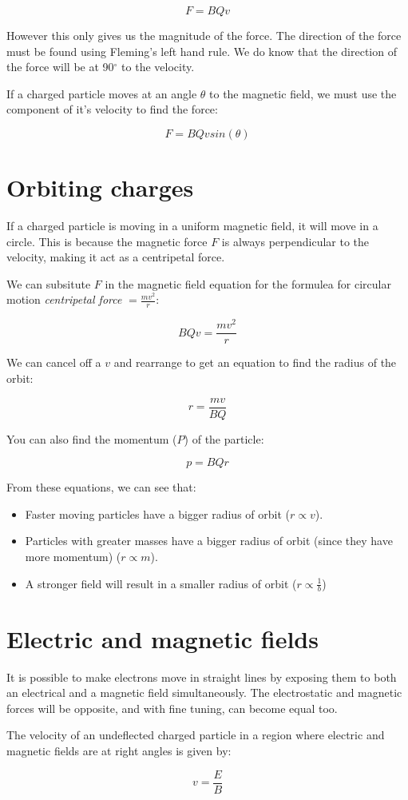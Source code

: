 \documentclass{article}
\begin{document}
\[
	F = BQv
\]

However this only gives us the magnitude of the force. The direction of the
force must be found using Fleming's left hand rule. We do know that the
direction of the force will be at 90$^\circ$ to the velocity.

If a charged particle moves at an angle $\theta$ to the magnetic field, we must
use the component of it's velocity to find the force:

\[
	F = BQvsin(\theta)
\]

\section*{Orbiting charges}

If a charged particle is moving in a uniform magnetic field, it will move in a
circle. This is because the magnetic force $F$ is always perpendicular to the
velocity, making it act as a centripetal force.

We can subsitute $F$ in the magnetic field equation for the formulea for
circular motion {\it centripetal force} $= \frac{mv^2}{r}$:

\[
	BQv = \frac{mv^2}{r}
\]

We can cancel off a $v$ and rearrange to get an equation to find the radius of
the orbit:

\[
	r = \frac{mv}{BQ}
\]

You can also find the momentum ($P$) of the particle: 

\[
	p = BQr
\]

From these equations, we can see that:

\begin{itemize}

	\item Faster moving particles have a bigger radius of orbit ($r \propto v$).

	\item Particles with greater masses have a bigger radius of orbit (since
	they have more momentum) ($r \propto m$).

	\item A stronger field will result in a smaller radius of orbit ($r \propto
	\frac{1}{b}$)

\end{itemize}

\section*{Electric and magnetic fields}

It is possible to make electrons move in straight lines by exposing them to both
an electrical and a magnetic field simultaneously. The electrostatic and
magnetic forces will be opposite, and with fine tuning, can become equal too.

The velocity of an undeflected charged particle in a region where electric and
magnetic fields are at right angles is given by:

\[
	v = \frac{E}{B}
\]
\end{document}
